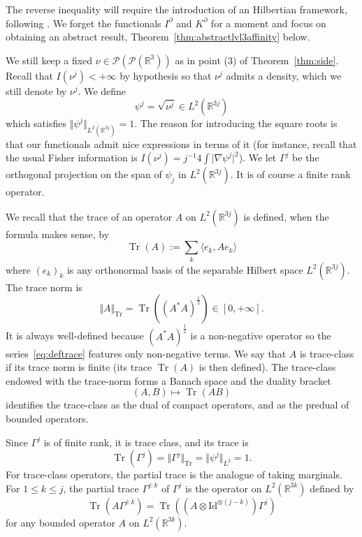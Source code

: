 \documentclass[11pt,a4paper]{article}
\theoremstyle{definition}
\theoremstyle{plain}
\DeclareMathOperator*{\Tr}{Tr}
\begin{document}
The reverse inequality will require the introduction of an Hilbertian framework, following \cite{Rougerie2020}. We forget the functionals $I^\partial$ and $K^\partial$ for a moment and focus on obtaining an abstract result, Theorem~\ref{thm:abstractlvl3affinity} below.

We still keep a fixed $\nu\in\mathcal{P}(\mathcal{P}(\mathbb{R}^3))$ as in point (3) of Theorem~\ref{thm:side}. Recall that $I(\nu^j)<+\infty$ by hypothesis so that $\nu^j$ admits a density, which we still denote by $\nu^j$. We define
$$\psi^j = \sqrt{\nu^j} \in L^2(\mathbb{R}^{3j})$$
which satisfies $\Vert \psi^j\Vert_{L^2(\mathbb{R}^{3j})}=1$. The reason for introducing the square roots is that our functionals admit nice expressions in terms of it (for instance, recall that the usual Fisher information is $I(\nu^j)=j^{-1}4\int \vert \nabla \psi^j\vert^2$). We let
$\Gamma^j$ be the orthogonal projection on the span of $\psi_j$ in $L^2(\mathbb{R}^{3j})$. It is of course a finite rank operator.

We recall that the trace of an operator $A$ on $L^2(\mathbb{R}^{3j})$ is defined, when the formula makes sense, by
\begin{equation}
\label{eq:deftrace}
    \Tr(A):= \sum_k \langle e_k, Ae_k\rangle
\end{equation}
where $(e_k)_k$ is any orthonormal basis of the separable Hilbert space $L^2(\mathbb{R}^{3j})$. The trace norm is
$$\Vert A \Vert_{\Tr} = \Tr((A^*A)^\frac{1}{2})\in [0,+\infty].$$
It is always well-defined because $(A^*A)^\frac{1}{2}$ is a non-negative operator so the series~\eqref{eq:deftrace} features only non-negative terms. We say that $A$ is trace-class if its trace norm is finite (its trace $\Tr(A)$ is then defined). The trace-class endowed with the trace-norm forms a Banach space and the duality bracket
$$(A,B)\mapsto \Tr(AB)$$
identifies the trace-class as the dual of compact operators, and as the predual of bounded operators.

Since $\Gamma^j$ is of finite rank, it is trace class, and its trace is
$$\Tr(\Gamma^j)=\Vert \Gamma^j \Vert_{\Tr} =\Vert\psi^j\Vert_{L^2}=1.$$
For trace-class operators, the partial trace is the analogue of taking marginals. For $1\leq k \leq j$, the partial trace $\Gamma^{j:k}$ of $\Gamma^j$ is the operator on $L^2(\mathbb{R}^{3k})$ defined by
    $$\Tr(A\Gamma^{j:k})=\Tr((A\otimes \text{Id}^{\otimes(j-k)})\Gamma^j)$$
for any bounded operator $A$ on $L^2(\mathbb{R}^{3k})$.
\end{document}
